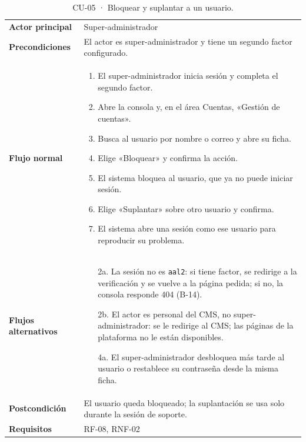 {\footnotesize
\begin{xltabular}{\textwidth}{@{}>{\bfseries}p{2.6cm}X@{}}
  \caption{CU-05 · Bloquear y suplantar a un usuario.}\label{tab:ana-cu05}\\
    \toprule
    Actor principal & Super-administrador \\
    Precondiciones & El actor es super-administrador y tiene un segundo factor configurado. \\
    \midrule
    Flujo normal &
      \begin{enumerate}[nosep,leftmargin=*]
        \item El super-administrador inicia sesión y completa el segundo factor.
        \item Abre la consola y, en el área Cuentas, «Gestión de cuentas».
        \item Busca al usuario por nombre o correo y abre su ficha.
        \item Elige «Bloquear» y confirma la acción.
        \item El sistema bloquea al usuario, que ya no puede iniciar sesión.
        \item Elige «Suplantar» sobre otro usuario y confirma.
        \item El sistema abre una sesión como ese usuario para reproducir su problema.
      \end{enumerate} \\
    \midrule
    Flujos alternativos &
      \begin{itemize}[nosep,leftmargin=*]
        \item[2a.] La sesión no es \texttt{aal2}: si tiene factor, se redirige a la verificación y se vuelve a la página pedida; si no, la consola responde 404 (B-14).
        \item[2b.] El actor es personal del CMS, no super-administrador: se le redirige al CMS; las páginas de la plataforma no le están disponibles.
        \item[4a.] El super-administrador desbloquea más tarde al usuario o restablece su contraseña desde la misma ficha.
      \end{itemize} \\
    \midrule
    Postcondición & El usuario queda bloqueado; la suplantación se usa solo durante la sesión de soporte. \\
    Requisitos & RF-08, RNF-02 \\
    \bottomrule
\end{xltabular}}

